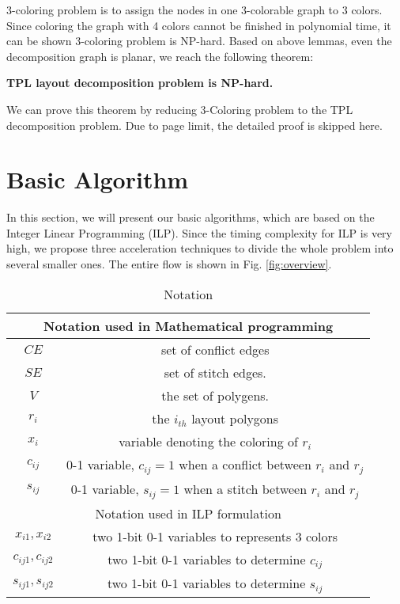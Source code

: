 \documentclass[10pt,conference]{IEEEtran}
\begin{document}
3-coloring problem is to assign the nodes in one 3-colorable graph to 3 colors.
Since coloring the graph with 4 colors cannot be finished in polynomial time, it can be shown 3-coloring problem is NP-hard.
Based on above lemmas, even the decomposition graph is planar, we reach the following theorem:

\begin{theorem}
\textbf{TPL layout decomposition problem is NP-hard.}
\end{theorem}

We can prove this theorem by reducing 3-Coloring problem to the TPL decomposition problem.
Due to page limit, the detailed proof is skipped here.



 \section{Basic Algorithm}
\label{chap:basic}

In this section, we will present our basic algorithms, which are based on the Integer Linear Programming (ILP).
Since the timing complexity for ILP is very high, we propose three acceleration techniques to divide the whole problem into several smaller ones. 
The entire flow is shown in Fig. \ref{fig:overview}.


\begin{table}[bt]
\renewcommand{\arraystretch}{1.3}
\centering 
\caption{Notation}
\label{table:ilp}
\begin{tabular}{|c|c|}
	\hline \hline
	\multicolumn{2}{|c|}{Notation used in Mathematical programming}\\
	\hline
	$CE$		& set of conflict edges\\
	\hline
	$SE$		& set of stitch edges.\\
	\hline
	$V$		& the set of polygens.\\
	\hline
	$r_i$		& the $i_{th}$ layout polygons\\
	\hline
	$x_i$		& variable denoting the coloring of $r_i$\\
	\hline
	$c_{ij}$	& 0-1 variable, $c_{ij}=1$ when a conflict between $r_i$ and $r_j$\\
	\hline
	$s_{ij}$	& 0-1 variable, $s_{ij}=1$ when a stitch between $r_i$ and $r_j$\\
	\hline
	\multicolumn{2}{|c|}{Notation used in ILP formulation}\\
	\hline
	$x_{i1}, x_{i2}$ & two 1-bit 0-1 variables to represents 3 colors\\
	\hline
	$c_{ij1}, c_{ij2}$ & two 1-bit 0-1 variables to determine $c_{ij}$\\
	\hline
	$s_{ij1}, s_{ij2}$ & two 1-bit 0-1 variables to determine $s_{ij}$\\
	\hline\hline
\end{tabular}
\end{table}
\end{document}
